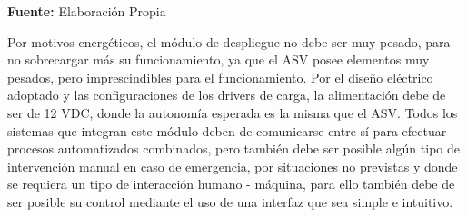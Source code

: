 \begin{table}[H]
\protect\caption[Datos T\'ecnicos m\'odulo despliegue]{Datos T\'ecnicos m\'odulo despliegue. \label{tab:carac_general}}
    \centering
    \vspace{5mm}
    \newline
    \hfill \textbf{Fuente:} Elaboraci\'on Propia
\end{table}
Por motivos energ\'eticos, el m\'odulo de despliegue no debe ser muy pesado, para no sobrecargar m\'as su funcionamiento, ya que el ASV posee elementos muy pesados, pero imprescindibles para el funcionamiento.
Por el diseño el\'ectrico adoptado y las configuraciones de los drivers de carga, la alimentación debe de ser de 12 VDC, donde la autonom\'ia esperada es la misma que el ASV. Todos los sistemas que integran este m\'odulo deben de comunicarse entre s\'i para efectuar procesos automatizados combinados, pero tambi\'en debe ser posible alg\'un tipo de intervenci\'on manual en caso de emergencia, por situaciones no previstas y donde se requiera un tipo de interacci\'on humano - máquina, para ello también debe de ser posible su control mediante el uso de una interfaz que sea simple e intuitivo.

